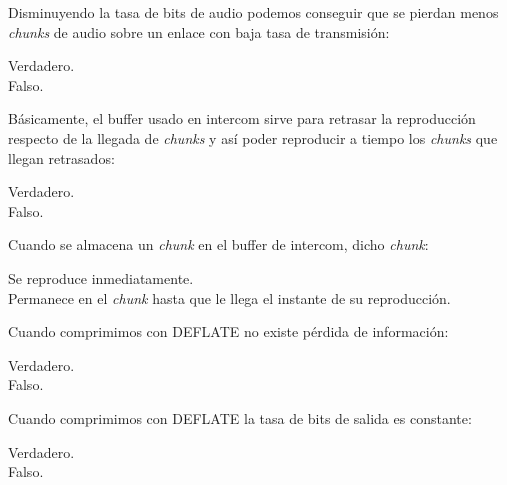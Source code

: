 \documentclass[legalpaper, 12pt, addpoints]{exam}
\begin{document}
\begin{questions}
\vspace{0.10in}

\question Disminuyendo la tasa de bits de audio podemos conseguir que se pierdan menos \emph{chunks} de audio sobre un enlace con baja tasa de transmisión:

\begin{oneparchoices}
  \choice Verdadero.\\
  \choice Falso.
\end{oneparchoices}
  
\vspace{0.10in}

\question Básicamente, el buffer usado en intercom sirve para retrasar la reproducción respecto de la llegada de \emph{chunks} y así poder reproducir a tiempo los \emph{chunks} que llegan retrasados:

\begin{oneparchoices}
  \choice Verdadero.\\
  \choice Falso.
\end{oneparchoices}
  
\vspace{0.10in}

\question Cuando se almacena un \emph{chunk} en el buffer de intercom, dicho \emph{chunk}:

\begin{oneparchoices}
  \choice Se reproduce inmediatamente.\\
  \choice Permanece en el \emph{chunk} hasta que le llega el instante de su reproducción.
\end{oneparchoices}
  
\vspace{0.10in}

\question Cuando comprimimos con DEFLATE no existe pérdida de información:

\begin{oneparchoices}
  \choice Verdadero.\\
  \choice Falso.
\end{oneparchoices}
  
\vspace{0.10in}

\question Cuando comprimimos con DEFLATE la tasa de bits de salida es constante:

\begin{oneparchoices}
  \choice Verdadero.\\
  \choice Falso.
\end{oneparchoices}
  

\end{questions}
\end{document}
